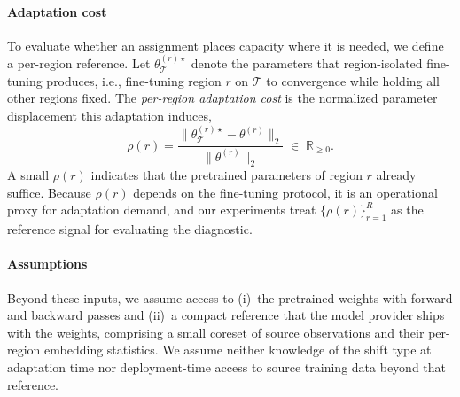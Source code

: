 \paragraph{Adaptation cost}
To evaluate whether an assignment places capacity where it is needed, we define a per-region reference.
Let $\theta^{(r)\star}_{\mathcal{T}}$ denote the parameters that region-isolated fine-tuning produces, i.e., fine-tuning region $r$ on $\mathcal{T}$ to convergence while holding all other regions fixed.
The \emph{per-region adaptation cost} is the normalized parameter displacement this adaptation induces,
%
\begin{equation}
\label{eq:adaptation-cost}
    \rho(r) = \frac{
        \bigl\lVert \theta^{(r)\star}_{\mathcal{T}} - \theta^{(r)} \bigr\rVert_2
    }{
        \bigl\lVert \theta^{(r)} \bigr\rVert_2
    } \;\in\; \mathbb{R}_{\geq 0}.
\end{equation}
%
A small $\rho(r)$ indicates that the pretrained parameters of region $r$ already suffice.
Because $\rho(r)$ depends on the fine-tuning protocol, it is an operational proxy for adaptation demand, and our experiments treat $\{\rho(r)\}_{r=1}^{R}$ as the reference signal for evaluating the diagnostic.

\paragraph{Assumptions}
Beyond these inputs, we assume access to (i)~the pretrained weights with forward and backward passes and (ii)~a compact reference that the model provider ships with the weights, comprising a small coreset of source observations and their per-region embedding statistics.
We assume neither knowledge of the shift type at adaptation time nor deployment-time access to source training data beyond that reference.
